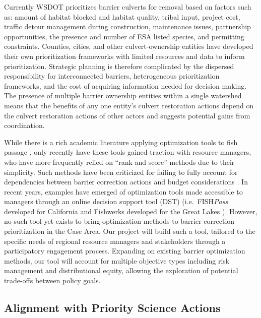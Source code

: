 \documentclass[12pt]{elsarticle}
\begin{document}
	Currently WSDOT prioritizes barrier culverts for removal based on factors such as: amount of habitat blocked and habitat quality, tribal input, project cost, traffic detour management during construction, maintenance issues, partnership opportunities, the presence and number of ESA listed species, and permitting constraints. Counties, cities, and other culvert-ownership entities have developed their own prioritization frameworks with limited resources and data to inform prioritization. Strategic planning is therefore complicated by the dispersed responsibility for interconnected barriers, heterogeneous prioritization frameworks, and the cost of acquiring information needed for decision making. The presence of multiple barrier ownership entities within a single watershed means that the benefits of any one entity's culvert restoration actions depend on the culvert restoration actions of other actors and suggests potential gains from coordination. 
	
	While there is a rich academic literature applying optimization tools to fish passage \citep{ohanley_optimizing_2005, kuby_multiobjective_2005, mcmanamay_commonalities_2019, couto_safeguarding_2021}, only recently have these tools gained traction with resource managers, who have more frequently relied on ``rank and score'' methods due to their simplicity. Such methods have been criticized for failing to fully account for dependencies between barrier correction actions and budget considerations \cite{mckay_comparison_2020}. In recent years, examples have emerged of optimization tools made accessible to managers through an online decision support tool (DST) (i.e.\ FISH\emph{Pass} developed for California \citep{ohanley_optipass_2015} and Fishwerks developed for the Great Lakes \citep{moody_pet_2017}). However, no such tool yet exists to bring optimization methods to barrier correction prioritization in the Case Area. Our project will build such a tool, tailored to the specific needs of regional resource managers and stakeholders through a participatory engagement process. Expanding on existing barrier optimization methods, our tool will account for multiple objective types including risk management and distributional equity, allowing the exploration of potential trade-offs between policy goals. 
	
	\subsection{Alignment with Priority Science Actions} %
	
\end{document}
